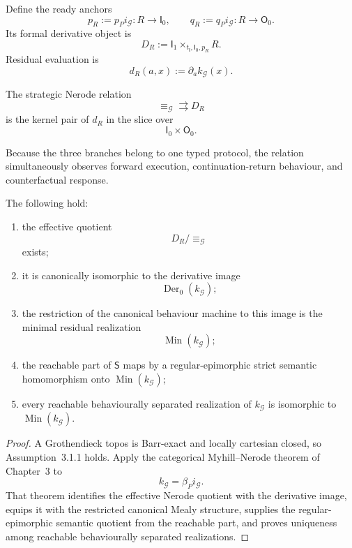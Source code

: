 Define the ready anchors
\[
  p_R:=p_Pi_{\mathcal G}:R\to\mathsf I_0,
  \qquad
  q_R:=q_Pi_{\mathcal G}:R\to\mathsf O_0.
\]
Its formal derivative object is
\[
  D_R
  :=
  \mathsf I_1
  \times_{t_{\mathsf I},\mathsf I_0,p_R}
  R.
\]
Residual evaluation is
\[
  d_R(a,x)
  :=
  \partial_a k_{\mathcal G}(x).
\]

\begin{definition}
\label{def:strategic-nerode-relation}
The strategic Nerode relation
\[
  {\equiv_{\mathcal G}}
  \rightrightarrows
  D_R
\]
is the kernel pair of \(d_R\) in the slice over
\[
  \mathsf I_0\times\mathsf O_0.
\]
\end{definition}

Because the three branches belong to one typed protocol, the relation simultaneously observes
forward execution, continuation-return behaviour, and counterfactual response.

\begin{theorem}
\label{thm:minimal-strategic-realization}
The following hold:
\begin{enumerate}
  \item the effective quotient
  \[
    D_R/{\equiv_{\mathcal G}}
  \]
  exists;
  \item it is canonically isomorphic to the derivative image
  \[
    \operatorname{Der}_0(k_{\mathcal G});
  \]
  \item the restriction of the canonical behaviour machine to this image is the minimal residual
  realization
  \[
    \operatorname{Min}(k_{\mathcal G});
  \]
  \item the reachable part of \(\mathsf S\) maps by a regular-epimorphic strict semantic
  homomorphism onto \(\operatorname{Min}(k_{\mathcal G})\);
  \item every reachable behaviourally separated realization of \(k_{\mathcal G}\) is isomorphic to
  \(\operatorname{Min}(k_{\mathcal G})\).
\end{enumerate}
\end{theorem}

\begin{proof}
A Grothendieck topos is Barr-exact and locally cartesian closed, so Assumption~3.1.1 holds. Apply the
categorical Myhill--Nerode theorem of Chapter~3 to
\[
  k_{\mathcal G}
  =
  \beta_Pi_{\mathcal G}.
\]
That theorem identifies the effective Nerode quotient with the derivative image, equips it with the
restricted canonical Mealy structure, supplies the regular-epimorphic semantic quotient from the
reachable part, and proves uniqueness among reachable behaviourally separated realizations.
\end{proof}

